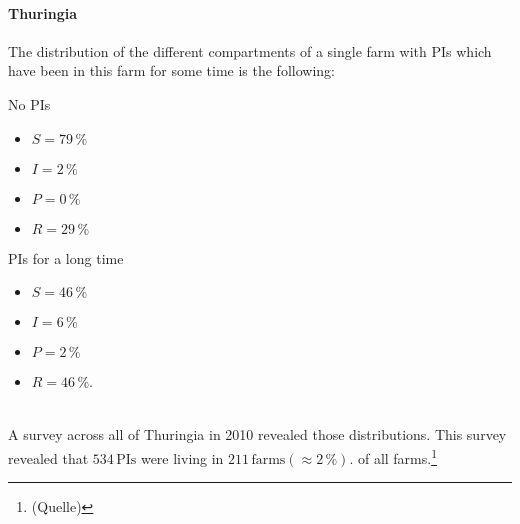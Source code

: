 \paragraph{Thuringia}
The distribution of the different compartments of a single farm with PIs which have been in this farm for some time is the following:
\\
\begin{minipage}[t]{0.5\linewidth}
No PIs
    \begin{itemize}
    \item $S= 79\,\%$
\item $I= 2\,\%$
\item $P= 0\,\%$ 
\item $R= 29\,\%$
    \end{itemize}
\end{minipage}
\begin{minipage}[t]{0.5\linewidth}
PIs for a long time
    \begin{itemize}
    \item $S= 46\,\%$
\item $I= 6\,\%$
\item $P= 2\,\%$ 
\item $R= 46\,\%$.
    \end{itemize}
\end{minipage}
\\
A survey across all of Thuringia in 2010 revealed those distributions. This survey revealed that $534\,\text{PIs}$ were living in $211\,\text{farms}(\approx 2\,\%)$. of all farms.\footnote{ (Quelle) }

